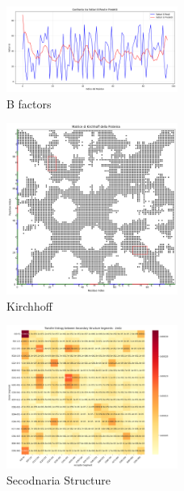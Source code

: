 \documentclass{article}
\begin{document}
\begin{figure}[H]
    \centering
    \includegraphics[width=0.5\textwidth]{"images/2m0zConfronto tra Fattori B Reali e Predetti.png"}
    \caption{B factors}
\end{figure}
\begin{figure}[H]
    \centering
    \includegraphics[width=0.5\textwidth]{"images/2m0z_Matrice di Kirchhoff della Proteina.png"}
    \caption{Kirchhoff}
\end{figure}
\begin{figure}[H]
    \centering
    \includegraphics[width=0.5\textwidth]{"images/2m0zanalyze_secondary_structure_transfer_entropy.png"}
    \caption{Secodnaria Structure}
\end{figure}
\end{document}
